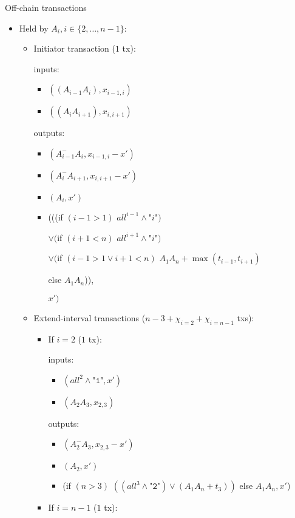 \begin{notitlebox}{Off-chain transactions}
\begin{itemize}
    \item Held by $A_i, i \in \{2, \dots, n-1\}$:

    \begin{itemize}
      \item Initiator transaction ($1$ tx):

      inputs:
      \begin{itemize}
        \item $((A_{i-1} A_i), x_{i-1,i})$
        \item $((A_i A_{i+1}), x_{i,i+1})$
      \end{itemize}
      outputs:
      \begin{itemize}
        \item $(A_{i-1}^- A_i, x_{i-1,i} - x')$
        \item $(A_i^- A_{i+1}, x_{i,i+1} - x')$
        \item $(A_i, x')$
        \item (((if $(i-1 > 1)$ $\mathit{all}^{i-1} \wedge
        \texttt{"}i\texttt{"})$

        $\vee ($if $(i+1 < n)$ $\mathit{all}^{i+1} \wedge
        \texttt{"}i\texttt{"})$

        $\vee ($if $(i-1 > 1 \vee i+1 < n)$ $A_1 A_n+\max{(t_{i-1}, t_{i+1})}$

        \:\:\: else $A_1 A_n$)),

        $x')$
      \end{itemize}
      \item Extend-interval transactions ($n-3 + \chi_{i=2} + \chi_{i=n-1}$ txs):
      \begin{itemize}
        \item If $i = 2$ ($1$ tx):

        inputs:
        \begin{itemize}
          \item $(\mathit{all}^2 \wedge \texttt{"1"}, x')$
          \item $(A_2 A_3, x_{2,3})$
        \end{itemize}
        outputs:
        \begin{itemize}
          \item $(A_2^- A_3, x_{2,3} - x')$
          \item $(A_2, x')$
          \item (if $(n > 3)$ $((\mathit{all}^{3} \wedge \texttt{"2"}) \vee
          (A_1 A_n + t_3))$ else $A_1 A_n, x'$)
        \end{itemize}
        \item If $i = n-1$ ($1$ tx):


\end{itemize}
\end{itemize}
\end{itemize}
\end{notitlebox}
